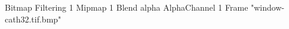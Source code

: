 {Bitmap
	{Filtering 1}
	{Mipmap 1}
	{Blend alpha}
	{AlphaChannel 1}
	{Frame "window-cath32.tif.bmp"}
}
